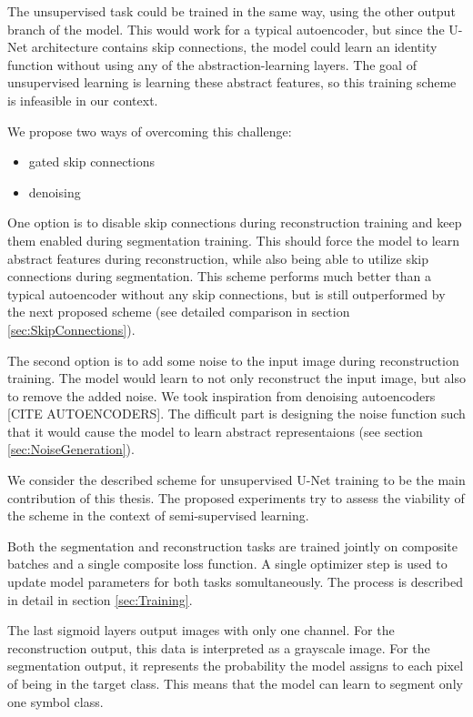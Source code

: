 The unsupervised task could be trained in the same way, using the other output branch of the model. This would work for a typical autoencoder, but since the U-Net architecture contains skip connections, the model could learn an identity function without using any of the abstraction-learning layers. The goal of unsupervised learning is learning these abstract features, so this training scheme is infeasible in our context.

We propose two ways of overcoming this challenge:

\begin{itemize}
    \item gated skip connections
    \item denoising
\end{itemize}

One option is to disable skip connections during reconstruction training and keep them enabled during segmentation training. This should force the model to learn abstract features during reconstruction, while also being able to utilize skip connections during segmentation. This scheme performs much better than a typical autoencoder without any skip connections, but is still outperformed by the next proposed scheme (see detailed comparison in section \ref{sec:SkipConnections}).

The second option is to add some noise to the input image during reconstruction training. The model would learn to not only reconstruct the input image, but also to remove the added noise. We took inspiration from denoising autoencoders [CITE AUTOENCODERS]. The difficult part is designing the noise function such that it would cause the model to learn abstract representaions (see section \ref{sec:NoiseGeneration}).

We consider the described scheme for unsupervised U-Net training to be the main contribution of this thesis. The proposed experiments try to assess the viability of the scheme in the context of semi-supervised learning.

Both the segmentation and reconstruction tasks are trained jointly on composite batches and a single composite loss function. A single optimizer step is used to update model parameters for both tasks somultaneously. The process is described in detail in section \ref{sec:Training}.

The last sigmoid layers output images with only one channel. For the reconstruction output, this data is interpreted as a grayscale image. For the segmentation output, it represents the probability the model assigns to each pixel of being in the target class. This means that the model can learn to segment only one symbol class.

